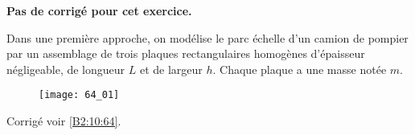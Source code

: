 \normaltrue \difficilefalse \tdifficilefalse
\correctionfalse


\setcounter{question}{0}
\ifcorrection
\else
\textbf{Pas de corrigé pour cet exercice.}
\fi



\ifprof
\else
Dans une première approche, on modélise le parc échelle d'un camion de pompier par un assemblage de trois plaques
rectangulaires homogènes d’épaisseur négligeable, de longueur $L$ et de largeur $h$. Chaque plaque a une masse notée $m$.


\begin{figure}[H]
\centering
\texttt{[image: 64\_01]}
\end{figure}
\fi

\ifprof
\else
\fi



\ifprof
\else
\begin{flushright}
\footnotesize{Corrigé voir \ref{B2:10:64}.}
\end{flushright}%
\fi